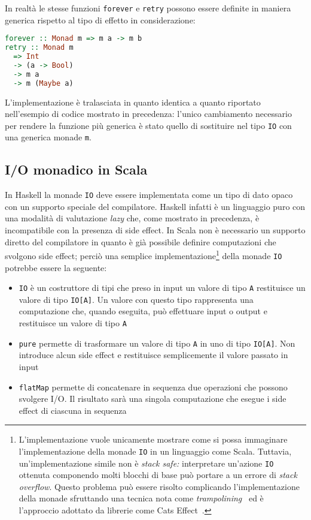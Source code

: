 In realtà le stesse funzioni \lstinline{forever} e \lstinline{retry} possono essere definite in maniera generica rispetto al tipo di effetto in considerazione:
\begin{lstlisting}[language=haskell]
forever :: Monad m => m a -> m b
retry :: Monad m
  => Int
  -> (a -> Bool)
  -> m a
  -> m (Maybe a)
\end{lstlisting}
L'implementazione è tralasciata in quanto identica a quanto riportato nell'esempio di codice mostrato in precedenza: l'unico cambiamento necessario per rendere la funzione più generica è stato quello di sostituire nel tipo \lstinline{IO} con una generica monade \lstinline{m}.

\subsection{I/O monadico in Scala}
In Haskell la monade \lstinline{IO} deve essere implementata come un tipo di dato opaco con un supporto speciale del compilatore. Haskell infatti è un linguaggio puro con una modalità di valutazione \emph{lazy} che, come mostrato in precedenza, è incompatibile con la presenza di side effect.
In Scala non è necessario un supporto diretto del compilatore in quanto è già possibile definire computazioni che svolgono side effect; perciò una semplice implementazione\footnote{L'implementazione vuole unicamente mostrare come si possa immaginare l'implementazione della monade \lstinline{IO} in un linguaggio come Scala. Tuttavia, un'implementazione simile non è \emph{stack safe:} interpretare un'azione \lstinline{IO} ottenuta componendo molti blocchi di base può portare a un errore di \emph{stack overflow}. Questo problema può essere risolto complicando l'implementazione della monade sfruttando una tecnica nota come \emph{trampolining}~\cite{cit:stackless-scala-with-free-monads} ed è l'approccio adottato da librerie come Cats Effect~\cite{cit:cats-effect-stack-safety}.} della monade \lstinline{IO} potrebbe essere la seguente:
\begin{itemize}
  \item \lstinline{IO} è un costruttore di tipi che preso in input un valore di tipo \lstinline{A} restituisce un valore di tipo \lstinline{IO[A]}. Un valore con questo tipo rappresenta una computazione che, quando eseguita, può effettuare input o output e restituisce un valore di tipo \lstinline{A}
  \item \lstinline{pure} permette di trasformare un valore di tipo \lstinline{A} in uno di tipo \lstinline{IO[A]}. Non introduce alcun side effect e restituisce semplicemente il valore passato in input
  \item \lstinline{flatMap} permette di concatenare in sequenza due operazioni che possono svolgere I/O. Il risultato sarà una singola computazione che esegue i side effect di ciascuna in sequenza
\end{itemize}

